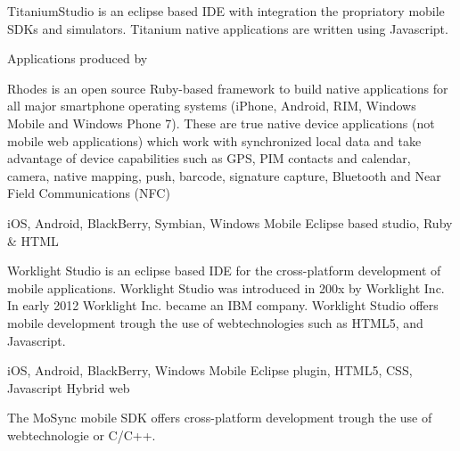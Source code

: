 TitaniumStudio is an eclipse based IDE with integration the propriatory mobile SDKs and simulators. Titanium native applications are written using Javascript.

Applications produced by 

Rhodes is an open source Ruby-based framework to build native applications for all major smartphone operating systems (iPhone, Android, RIM, Windows Mobile and Windows Phone 7). These are true native device applications (not mobile web applications) which work with synchronized local data and take advantage of device capabilities such as GPS, PIM contacts and calendar, camera, native mapping, push, barcode, signature capture, Bluetooth and Near Field Communications (NFC)

iOS, Android, BlackBerry, Symbian, Windows Mobile
Eclipse based studio, Ruby \& HTML


Worklight Studio is an eclipse based IDE for the cross-platform development of mobile applications. Worklight Studio was introduced in 200x by Worklight Inc. In early 2012 Worklight Inc. became an IBM company. Worklight Studio offers mobile development trough the use of webtechnologies such as HTML5, and Javascript.

iOS, Android, BlackBerry, Windows Mobile	
Eclipse plugin, HTML5, CSS, Javascript
Hybrid web

The MoSync mobile SDK offers cross-platform development trough the use of webtechnologie or C/C++.

















